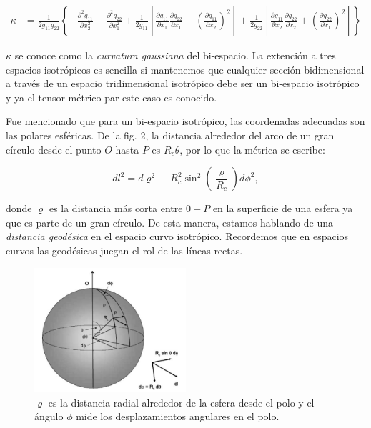 \documentclass{article}
\begin{document}
    \begin{align*}
        \kappa & = \frac{1}{2 g_{11} g_{22}} \left\{ - \frac{\partial^2g_{11} }{\partial x_2^2} - \frac{\partial^2g_{22} }{\partial x_1^2} + \frac{1}{2 g_{11}} \left[ \frac{\partial g_{11} }{\partial x_1} \frac{\partial g_{22} }{\partial x_1} +   \left( \frac{\partial g_{11} }{\partial x_2} \right)^2 \right] 
        + \frac{1}{2 g_{22}} \left[ \frac{\partial g_{11} }{\partial x_2} \frac{\partial g_{22} }{\partial x_2} + \left( \frac{\partial g_{22} }{\partial x_1} \right)^2 \right] \right\} 
    \end{align*}

$\kappa$ se conoce como la {\textit{curvatura gaussiana}} del bi-espacio. La extención a tres espacios isotrópicos es sencilla si mantenemos que cualquier sección bidimensional a través de un espacio tridimensional isotrópico debe ser un bi-espacio isotrópico y ya el tensor métrico par este caso es conocido. 

Fue mencionado que para un bi-espacio isotrópico, las coordenadas adecuadas son las polares esféricas. De la fig. 2, la distancia alrededor del arco de un gran círculo desde el punto $O$ hasta $P$ es $R_c \theta$, por lo que la métrica se escribe:

    \begin{equation}
        dl^2 = d\varrho^2 + R_c^2 \sin^2\left(\frac{\varrho}{R_c} \right) d\phi^2,
    \end{equation}

donde $\varrho$ es la distancia más corta entre $0-P$  en la superficie de una esfera ya que es parte de un gran  círculo. De esta manera, estamos hablando de una {\textit{distancia geodésica}} en el espacio curvo isotrópico. Recordemos que en espacios curvos las geodésicas juegan el rol de las líneas rectas.

    \begin{figure}               \includegraphics[width=0.5\textwidth]{superficie_esferica_pp156_angulos.png}
        \caption{\footnotesize{$\varrho$ es la distancia radial alrededor de la esfera desde el polo y el ángulo $\phi$ mide los desplazamientos angulares en el polo.}}
    \end{figure}
\end{document}
